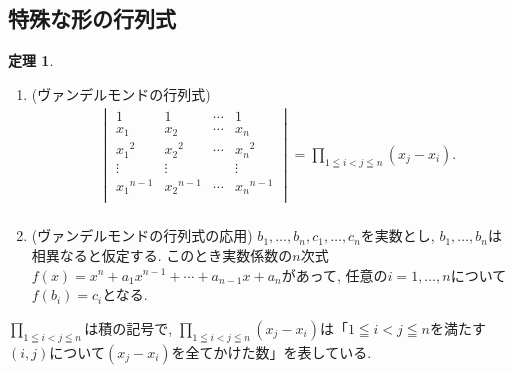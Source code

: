 \documentclass[dvipdfmx,a4paper,11pt]{article}
\theoremstyle{definition}
\newtheorem{thm}{定理}
\begin{document}
\subsection{特殊な形の行列式 \cite[3.5節]{M}}
\begin{tcolorbox}[
    colback = white,
    colframe = green!35!black,
    fonttitle = \bfseries,
    breakable = true]
    \begin{thm}
  \begin{enumerate}
\item (ヴァンデルモンドの行列式)
\begin{align*}
 &
 \begin{vmatrix}
1   &   1     & \cdots &  1  \\
x_1& x_2 & \cdots &x_n \\
{x_1}^{2}& {x_2}^{2} & \cdots &{x_n}^{2} \\
\vdots & \vdots    &  &\vdots \\
{x_1}^{n-1}& {x_2}^{n-1} & \cdots &{x_n}^{n-1} \\
\end{vmatrix}
= \prod_{1 \leqq i < j \leqq n} (x_j - x_i).
\\%
\end{align*}
\item (ヴァンデルモンドの行列式の応用) $b_1, \ldots, b_n, c_1, \ldots, c_n$を実数とし, $b_1, \ldots, b_n$は相異なると仮定する.
 このとき実数係数の$n$次式$f(x) = x^{n} +  a_1 x^{n-1} +  \cdots +  a_{n-1} x + a_{n}$があって, 任意の$i = 1, \ldots, n$について$f(b_i) =c_i $となる.

  \end{enumerate}
    \end{thm}
 \end{tcolorbox}
$\prod_{1 \leqq i < j \leqq n}$は積の記号で, $\prod_{1 \leqq i < j \leqq n} (x_j - x_i)$は「$1 \leqq i < j \leqq n$を満たす$(i,j)$について$ (x_j - x_i)$を全てかけた数」を表している.
\end{document}
